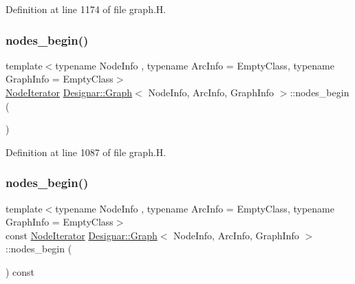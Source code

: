 Definition at line 1174 of file graph.\+H.

\mbox{\label{class_designar_1_1_graph_a4f492f9b89d1d647e53171d7bb4d4acd}} 
\subsubsection{\texorpdfstring{nodes\+\_\+begin()}{nodes\_begin()}\hspace{0.1cm}{\footnotesize\ttfamily [1/2]}}
{\footnotesize\ttfamily template$<$typename Node\+Info , typename Arc\+Info  = Empty\+Class, typename Graph\+Info  = Empty\+Class$>$ \\
\hyperlink{class_designar_1_1_graph_1_1_node_iterator}{Node\+Iterator} \hyperlink{class_designar_1_1_graph}{Designar\+::\+Graph}$<$ Node\+Info, Arc\+Info, Graph\+Info $>$\+::nodes\+\_\+begin (\begin{DoxyParamCaption}{ }\end{DoxyParamCaption})\hspace{0.3cm}{\ttfamily [inline]}}



Definition at line 1087 of file graph.\+H.

\mbox{\label{class_designar_1_1_graph_acd4d942eba98e1eb138b9566f1d9bb75}} 
\subsubsection{\texorpdfstring{nodes\+\_\+begin()}{nodes\_begin()}\hspace{0.1cm}{\footnotesize\ttfamily [2/2]}}
{\footnotesize\ttfamily template$<$typename Node\+Info , typename Arc\+Info  = Empty\+Class, typename Graph\+Info  = Empty\+Class$>$ \\
const \hyperlink{class_designar_1_1_graph_1_1_node_iterator}{Node\+Iterator} \hyperlink{class_designar_1_1_graph}{Designar\+::\+Graph}$<$ Node\+Info, Arc\+Info, Graph\+Info $>$\+::nodes\+\_\+begin (\begin{DoxyParamCaption}{ }\end{DoxyParamCaption}) const\hspace{0.3cm}{\ttfamily [inline]}}



